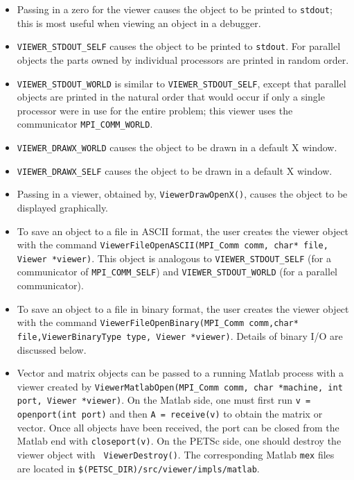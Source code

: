 \begin{itemize}
\item Passing in a zero for the viewer causes the object to be printed 
      to {\tt stdout}; this is most useful when viewing an object in 
      a debugger.
\item {\tt VIEWER\_STDOUT\_SELF} 
      causes the object to be printed to {\tt stdout}.
      For parallel objects the parts owned by individual processors are 
      printed in random order.
\item {\tt VIEWER\_STDOUT\_WORLD} 
      is similar to {\tt VIEWER\_STDOUT\_SELF}, except that 
      parallel objects are printed in the natural order that would occur
      if only a single processor were in use for the entire problem;
      this viewer uses the communicator {\tt MPI\_COMM\_WORLD}.
\item {\tt VIEWER\_DRAWX\_WORLD}  causes the 
      object to be drawn in a default X window.
\item {\tt VIEWER\_DRAWX\_SELF}  causes the 
      object to be drawn in a default X window.
\item Passing in a viewer, obtained by, 
      {\tt ViewerDrawOpenX()}, causes the object to be displayed graphically.
\item To save an object to a file in ASCII format, the user creates
      the viewer object with the command
      {\tt ViewerFileOpenASCII(MPI\_Comm comm, char* file, Viewer *viewer)}.  
      This object is 
      analogous to {\tt VIEWER\_STDOUT\_SELF} (for a communicator of
      {\tt MPI\_COMM\_SELF}) and 
      {\tt VIEWER\_STDOUT\_WORLD} (for a parallel communicator).
\item To save an object to a file in binary format, the user creates
      the viewer object with the command
      {\tt ViewerFileOpenBinary(MPI\_Comm comm,char* file,ViewerBinaryType type,
      Viewer *viewer)}.   Details of binary
      I/O are discussed below.
\item Vector and matrix objects can be passed to a running Matlab process
      with a viewer created by {\tt ViewerMatlabOpen(MPI\_Comm comm,
      char *machine, int port, Viewer *viewer)}.  
      On the Matlab side, one must first run {\tt v = openport(int port)}
      and then {\tt A = receive(v)} to obtain the matrix or vector. Once all
      objects have been received, the port can be closed from the Matlab end
      with {\tt closeport(v)}. On the PETSc side, one should destroy
      the viewer object with  {\tt
      ViewerDestroy()}. The corresponding Matlab {\tt mex}
      files are located in {\tt \$(PETSC\_DIR)/src/viewer/impls/matlab}.
\end{itemize}

